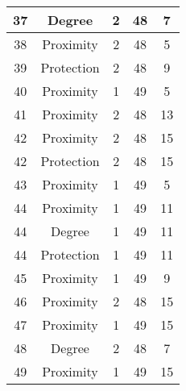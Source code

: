 \documentclass[results.tex]{subfiles}
\begin{document}
\begin{center}
\begin{tabular}{| c || c | c | c | c |}
    \hline
    37 & Degree & 2 & 48 & 7 \\ 
    \hline
    38 & Proximity & 2 & 48 & 5 \\ 
    \hline
    39 & Protection & 2 & 48 & 9 \\ 
    \hline
    40 & Proximity & 1 & 49 & 5 \\ 
    \hline
    41 & Proximity & 2 & 48 & 13 \\ 
    \hline
    42 & Proximity & 2 & 48 & 15 \\ 
    \hline
    42 & Protection & 2 & 48 & 15 \\ 
    \hline
    43 & Proximity & 1 & 49 & 5 \\ 
    \hline
    44 & Proximity & 1 & 49 & 11 \\ 
    \hline
    44 & Degree & 1 & 49 & 11 \\ 
    \hline
    44 & Protection & 1 & 49 & 11 \\ 
    \hline
    45 & Proximity & 1 & 49 & 9 \\ 
    \hline
    46 & Proximity & 2 & 48 & 15 \\ 
    \hline
    47 & Proximity & 1 & 49 & 15 \\ 
    \hline
    48 & Degree & 2 & 48 & 7 \\ 
    \hline
    49 & Proximity & 1 & 49 & 15 \\ 
    \hline   \end{tabular}
\end{center}
\end{document}
